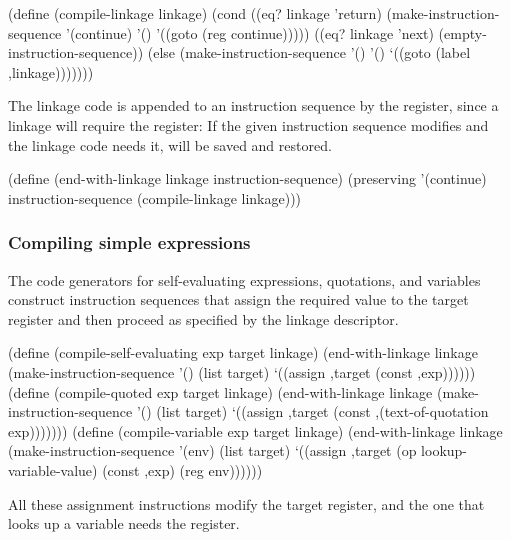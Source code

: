 \begin{codeBlock}
(define (compile-linkage linkage)
  (cond ((eq? linkage 'return)
         (make-instruction-sequence '(continue) '()
          '((goto (reg continue)))))
        ((eq? linkage 'next)
         (empty-instruction-sequence))
        (else
         (make-instruction-sequence '() '()
          `((goto (label ,linkage)))))))
\end{codeBlock}

\noindent
The linkage code is appended to an instruction sequence by 
the  register, since a  linkage will require the
 register: If the given instruction sequence modifies
 and the linkage code needs it,  will be saved
and restored.

\begin{codeBlock}
(define (end-with-linkage linkage instruction-sequence)
  (preserving '(continue)
   instruction-sequence
   (compile-linkage linkage)))
\end{codeBlock}

\subsubsection*{Compiling simple expressions}

The code generators for self-evaluating expressions, quotations, and variables
construct instruction sequences that assign the required value to the target
register and then proceed as specified by the linkage descriptor.

\begin{codeBlock}
(define (compile-self-evaluating exp
                                 target
                                 linkage)
  (end-with-linkage
    linkage
    (make-instruction-sequence
      '() (list target)
      `((assign ,target (const ,exp))))))
(define (compile-quoted exp target linkage)
  (end-with-linkage
    linkage
    (make-instruction-sequence
      '() (list target)
      `((assign ,target
                (const ,(text-of-quotation exp)))))))
(define (compile-variable exp target linkage)
  (end-with-linkage
    linkage
    (make-instruction-sequence
      '(env) (list target)
      `((assign ,target
                (op lookup-variable-value)
                (const ,exp)
                (reg env))))))
\end{codeBlock}

\noindent
All these assignment instructions modify the target register, and the one that
looks up a variable needs the  register.

